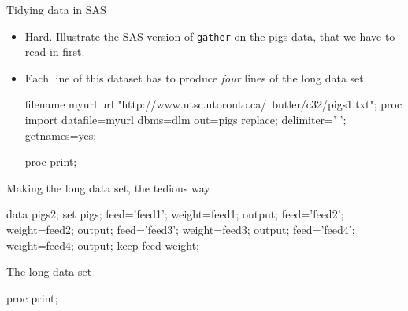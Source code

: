 \documentclass[unknownkeysallowed]{beamer}\usepackage[]{graphicx}\usepackage[]{color}
\begin{document}
\begin{frame}[fragile]{Tidying data in SAS}
  
  \begin{itemize}
  \item Hard. Illustrate the SAS version
    of \texttt{gather} on the pigs data, that we have to read in first.
  \item Each line of this dataset has to produce \emph{four} lines
    of the long data set. 
    
    \begin{Datastep}
filename myurl url 
  "http://www.utsc.utoronto.ca/~butler/c32/pigs1.txt";      
proc import 
  datafile=myurl
  dbms=dlm out=pigs replace;
  delimiter=' ';
  getnames=yes;
    \end{Datastep}
    
    \begin{Sascode}[store=tn]
proc print;      
    \end{Sascode}
    
    
  \end{itemize}
  
\end{frame}

\begin{frame}[fragile]{Making the long data set, the tedious way}
  
  \begin{Datastep}
data pigs2;
  set pigs;
  feed='feed1';
  weight=feed1;
  output;
  feed='feed2';
  weight=feed2;
  output;
  feed='feed3';
  weight=feed3;
  output;
  feed='feed4';
  weight=feed4;
  output;
  keep feed weight;
  \end{Datastep}
  
\end{frame}

\begin{frame}[fragile]{The long data set}
  
  \begin{Sascode}[store=to]
proc print;    
  \end{Sascode}
  
  
\end{frame}
\end{document}
